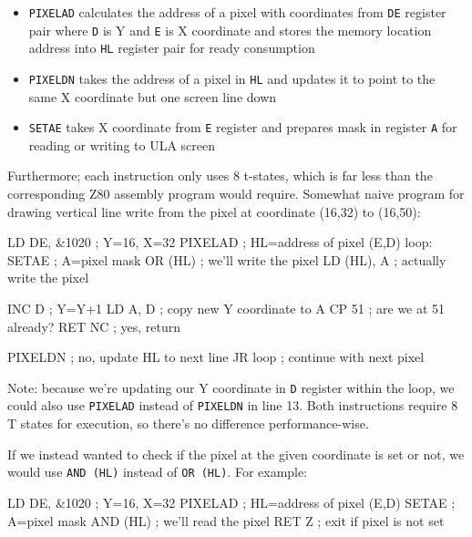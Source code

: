\begin{itemize}[topsep=1pt,itemsep=1pt]
	\item {\tt PIXELAD} calculates the address of a pixel with coordinates from {\tt DE} register pair where {\tt D} is Y and {\tt E} is X coordinate and stores the memory location address into {\tt HL} register pair for ready consumption
	
	\item {\tt PIXELDN} takes the address of a pixel in {\tt HL} and updates it to point to the same X coordinate but one screen line down
	
	\item {\tt SETAE} takes X coordinate from {\tt E} register and prepares mask in register {\tt A} for reading or writing to ULA screen
\end{itemize}

Furthermore; each instruction only uses 8 t-states, which is far less than the corresponding Z80 assembly program would require. Somewhat naive program for drawing vertical line write from the pixel at coordinate (16,32) to (16,50):

\begin{tcblisting}{}
	LD DE, &1020      ; Y=16, X=32
	PIXELAD           ; HL=address of pixel (E,D)
loop:
	SETAE             ; A=pixel mask
	OR (HL)           ; we'll write the pixel
	LD (HL), A        ; actually write the pixel
	
	INC D             ; Y=Y+1
	LD A, D           ; copy new Y coordinate to A
	CP 51             ; are we at 51 already?
	RET NC            ; yes, return

	PIXELDN           ; no, update HL to next line
	JR loop           ; continue with next pixel
\end{tcblisting}

Note: because we're updating our Y coordinate in {\tt D} register within the loop, we could also use {\tt PIXELAD} instead of {\tt PIXELDN} in line 13. Both instructions require 8 T states for execution, so there's no difference performance-wise.

If we instead wanted to check if the pixel at the given coordinate is set or not, we would use {\tt AND (HL)} instead of {\tt OR (HL)}. For example:

\begin{tcblisting}{}
	LD DE, &1020      ; Y=16, X=32
	PIXELAD           ; HL=address of pixel (E,D)
	SETAE             ; A=pixel mask
	AND (HL)          ; we'll read the pixel
	RET Z             ; exit if pixel is not set
\end{tcblisting}


